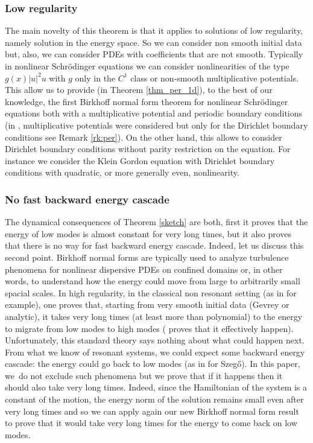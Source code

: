 \subsubsection*{Low regularity}
The main novelty of this theorem is that it applies to solutions of low regularity, namely solution in the energy space. So we can consider non smooth initial data but, also, we can consider PDEs with coefficients that are not smooth. Typically in nonlinear Schrödinger equations we can consider nonlinearities of the type $g(x)|u|^2u$ with $g$ only in the $C^1$ class or non-smooth multiplicative potentials. This allow us to provide (in Theorem \ref{thm_per_1d}), to the best of our knowledge, the first Birkhoff normal form theorem for nonlinear Schrödinger equations both with a multiplicative potential and periodic boundary conditions (in \cite{BG06}, multiplicative potentials were considered but only for the Dirichlet boundary conditions see Remark \ref{rk:per}). On the other hand, this allows to consider Dirichlet boundary conditions without parity restriction on the equation. For instance we consider the Klein Gordon equation with Dirichlet boundary conditions with quadratic, or more generally even, nonlinearity.

\subsubsection*{No fast backward energy cascade}
The dynamical consequences of Theorem \ref{sketch} are both, first it proves that the energy of low modes is almost constant for very long times, but it also proves that there is no way for fast backward energy cascade. Indeed, let us discuss this second point. Birkhoff normal forms are typically used to analyze turbulence phenomena for nonlinear dispersive PDEs on confined domains or, in other words, to understand how the energy could move from large to arbitrarily small spacial scales. In high regularity, in the classical non resonant setting (\ie as in \cite{BG06} for example), one proves that, starting from very smooth initial data (\eg Gevrey or analytic), it takes very long times (\ie at least more than polynomial) to the energy to migrate from low modes to high modes (\cite{Gua14} proves that it effectively happen). Unfortunately, this standard theory says nothing about what could happen next. From what we know of resonant systems, we could expect some backward energy cascade: the energy could go back to low modes (as in \cite{GG17} for Szegő). In this paper, we~do not exclude such phenomena but we prove that if it happens then it should also take very long times. Indeed, since the Hamiltonian of the system is a constant of the motion, the energy norm of the solution remains small even after very long times and so we can apply again our new Birkhoff normal form result to prove that it would take very long times for the energy to come back on low modes.

